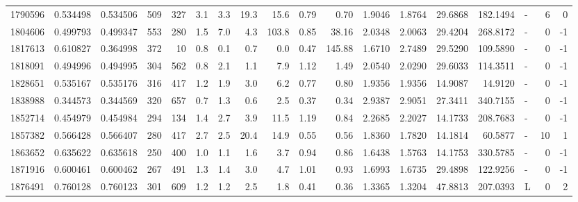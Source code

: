 \begin{tabular}{rrrrrrrrrrrrrrrlrr}
   1790596 & 0.534498 &   0.534506 &  509 &  327 &      3.1 &      3.3 &    19.3 &     15.6 &       0.79 &        0.70 &  1.9046 &  1.8764 &   29.6868 &  182.1494 &             - &        6 &          0 \\
   1804606 & 0.499793 &   0.499347 &  553 &  280 &      1.5 &      7.0 &     4.3 &    103.8 &       0.85 &       38.16 &  2.0348 &  2.0063 &   29.4204 &  268.8172 &             - &        0 &         -1 \\
   1817613 & 0.610827 &   0.364998 &  372 &   10 &      0.8 &      0.1 &     0.7 &      0.0 &       0.47 &      145.88 &  1.6710 &  2.7489 &   29.5290 &  109.5890 &             - &        0 &         -1 \\
   1818091 & 0.494996 &   0.494995 &  304 &  562 &      0.8 &      2.1 &     1.1 &      7.9 &       1.12 &        1.49 &  2.0540 &  2.0290 &   29.6033 &  114.3511 &             - &        0 &         -1 \\
   1828651 & 0.535167 &   0.535176 &  316 &  417 &      1.2 &      1.9 &     3.0 &      6.2 &       0.77 &        0.80 &  1.9356 &  1.9356 &   14.9087 &   14.9120 &             - &        0 &         -1 \\
   1838988 & 0.344573 &   0.344569 &  320 &  657 &      0.7 &      1.3 &     0.6 &      2.5 &       0.37 &        0.34 &  2.9387 &  2.9051 &   27.3411 &  340.7155 &             - &        0 &         -1 \\
   1852714 & 0.454979 &   0.454984 &  294 &  134 &      1.4 &      2.7 &     3.9 &     11.5 &       1.19 &        0.84 &  2.2685 &  2.2027 &   14.1733 &  208.7683 &             - &        0 &         -1 \\
   1857382 & 0.566428 &   0.566407 &  280 &  417 &      2.7 &      2.5 &    20.4 &     14.9 &       0.55 &        0.56 &  1.8360 &  1.7820 &   14.1814 &   60.5877 &             - &       10 &          1 \\
   1863652 & 0.635622 &   0.635618 &  250 &  400 &      1.0 &      1.1 &     1.6 &      3.7 &       0.94 &        0.86 &  1.6438 &  1.5763 &   14.1753 &  330.5785 &             - &        0 &         -1 \\
   1871916 & 0.600461 &   0.600462 &  267 &  491 &      1.3 &      1.4 &     3.0 &      4.7 &       1.01 &        0.93 &  1.6993 &  1.6735 &   29.4898 &  122.9256 &             - &        0 &         -1 \\
   1876491 & 0.760128 &   0.760123 &  301 &  609 &      1.2 &      1.2 &     2.5 &      1.8 &       0.41 &        0.36 &  1.3365 &  1.3204 &   47.8813 &  207.0393 &             L &        0 &          2 \\

\end{tabular}

